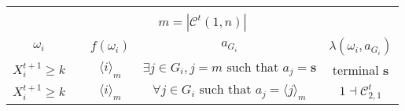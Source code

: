 \documentclass[12pt,letter]{article}
\newcommand{\Kappa}{\mathcal{C}}
\theoremstyle{definition}
\theoremstyle{remark}
\theoremstyle{claim}
\begin{document}
\begin{table}[!htbp]
\begin{center}
\begin{tabular}{c c | c | c | c}
\hline
\\
\multicolumn{5}{c}{$m= |\Kappa^t(1,n)|$}\\
$\omega_i$ 	 & 	   &	$f(\omega_i)$  &	$a_{G_i}$ & $\lambda(\omega_i,a_{G_i})$ \\
\hline
\hline
$X^{t+1}_i\geq k$ 	& 						& $\langle i \rangle_m$		&  $\exists j\in G_i, j=m\text{ such that } a_j=\textbf{s}$	& terminal \textbf{s}\\
$X^{t+1}_i\geq k$ 	& 						& $\langle i \rangle_m$		&  $\forall j\in G_i\text{ such that } a_j= \langle j \rangle_m$	& $1\dashv \Kappa^t_{2,1}$\\
\hline
\end{tabular}
\end{center}
\end{table}


\clearpage
\end{document}
